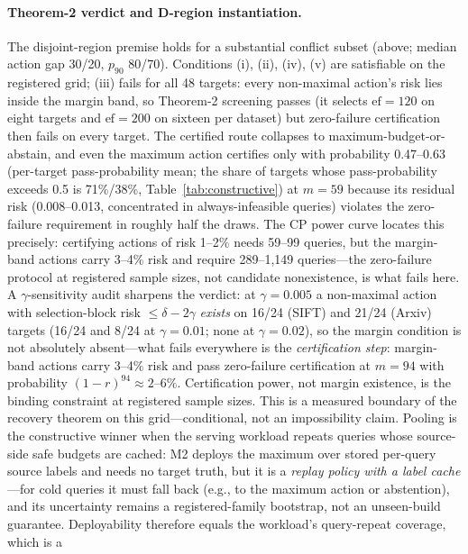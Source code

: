 \documentclass{article}
\begin{document}
\paragraph{Theorem-2 verdict and D-region instantiation.}
The disjoint-region premise holds for a substantial conflict subset (above; median action gap 30/20,
$p_{90}$ 80/70).
Conditions (i), (ii), (iv), (v) are satisfiable on the registered grid; (iii) fails for all 48 targets:
every non-maximal action's risk lies inside the margin band, so Theorem-2 screening passes (it selects
$\mathrm{ef}{=}120$ on eight targets and $\mathrm{ef}{=}200$ on sixteen per dataset) but zero-failure
certification then fails on every target. The certified route collapses to
maximum-budget-or-abstain, and even the maximum action certifies only with probability 0.47--0.63 (per-target pass-probability
mean; the share of targets whose pass-probability exceeds 0.5 is 71\%/38\%,
Table~\ref{tab:constructive}) at $m=59$ because its residual risk (0.008--0.013, concentrated in
always-infeasible queries) violates the zero-failure requirement in roughly half the draws. The CP power curve locates this precisely: certifying
actions of risk 1--2\% needs 59--99 queries, but the margin-band actions carry 3--4\% risk and require
289--1{,}149 queries---the zero-failure protocol at registered sample sizes, not candidate nonexistence,
is what fails here. A $\gamma$-sensitivity audit sharpens the verdict: at
$\gamma{=}0.005$ a non-maximal action with selection-block risk $\le\delta-2\gamma$ \emph{exists} on
16/24 (SIFT) and 21/24 (Arxiv) targets (16/24 and 8/24 at $\gamma{=}0.01$; none at $\gamma{=}0.02$), so
the margin condition is not absolutely absent---what fails everywhere is the \emph{certification step}:
margin-band actions carry 3--4\% risk and pass zero-failure certification at $m{=}94$ with probability
$(1-r)^{94}\approx2$--$6\%$. Certification power, not margin existence, is the binding constraint at
registered sample sizes. This is a measured boundary of the recovery theorem on this grid---conditional,
not an impossibility claim. Pooling is the constructive winner when the serving workload repeats queries whose source-side safe
budgets are cached: M2 deploys the maximum over stored per-query source labels and needs no target truth,
but it is a \emph{replay policy with a label cache}---for cold queries it must fall back (e.g., to the
maximum action or abstention), and its uncertainty remains a registered-family bootstrap, not an
unseen-build guarantee. Deployability therefore equals the workload's query-repeat coverage, which is a
\end{document}

